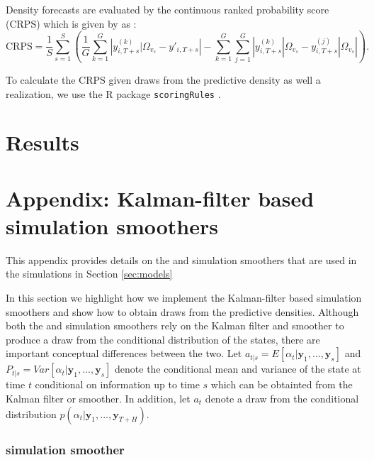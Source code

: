 \documentclass[notitlepage,a4paper,12pt]{article}
\begin{document}
Density forecasts are evaluated by the continuous ranked probability score (CRPS) which is given by as \citep[see][]{Gneitingetal2016}:
\begin{equation*}
\text{CRPS} = \frac{1}{S} \sum_{s=1}^{S} \left( \frac{1}{G} \sum_{k=1}^G \left\lvert {y}^{(k)}_{i,T+s}|\Omega_{v_{s}} - y'_{i, T+s} \right\rvert - \sum_{k=1}^G \sum_{j=1}^G \left\lvert {y}^{(k)}_{i,T+s}|\Omega_{v_{s}} - {y}^{(j)}_{i,T+s}|\Omega_{v_{s}} \right\rvert \right).
\end{equation*}

To calculate the CRPS given draws from the predictive density as well a realization, we use the R package \texttt{scoringRules} \citep{jkl_2019_jss}.

\section{Results}





\appendix

\section{Appendix: Kalman-filter based simulation smoothers}\label{app:kalmansimsmoothers}

This appendix provides details on the \citet{carterkohn1994_biomtr} and \citet{durbinkoopman2002_biomtr} simulation smoothers that are used in the simulations in Section \ref{sec:models}

In this section we highlight how we implement the Kalman-filter based simulation smoothers and show how to obtain draws from the predictive densities. Although both the \citet{carterkohn1994_biomtr} and \citet{durbinkoopman2002_biomtr} simulation smoothers rely on the Kalman filter and smoother to produce a draw from the conditional distribution of the states, there are important conceptual differences between the two. Let $a_{t|s} = E[\alpha_t|\mathbf{y}_1, \dots, \mathbf{y}_s]$ and $P_{t|s} = Var[\alpha_t|\mathbf{y}_1, \dots, \mathbf{y}_s]$ denote the conditional mean and variance of the state at time $t$ conditional on information up to time $s$ which can be obtainted from the Kalman filter or smoother. In addition, let $a_t$ denote a draw from the conditional distribution $p(\alpha_t | \mathbf{y}_1, \dots, \mathbf{y}_{T+H})$. 

\subsubsection{\citet{carterkohn1994_biomtr} simulation smoother}
\end{document}
